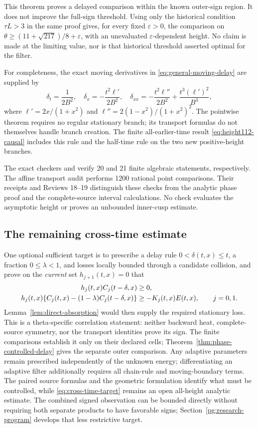 \documentclass[11pt]{article}
\numberwithin{equation}{section}
\theoremstyle{definition}
\theoremstyle{remark}
\begin{document}
This theorem proves a delayed comparison within the known outer-sign
region.  It does not improve the full-sign threshold.  Using only the
historical condition $\tau L>3$ in the same proof gives, for every
fixed $\varepsilon>0$, the comparison on
$\theta\ge(11+\sqrt{217})/8+\varepsilon$, with an unevaluated
$\varepsilon$-dependent height.  No claim is made at the limiting
value, nor is that historical threshold asserted optimal for the filter.

For completeness, the exact moving derivatives in
\eqref{eq:general-moving-delay} are supplied by
\[
 \delta_t=\frac1{2B^2},\quad
 \delta_x=-\frac{t^2\ell'}{2B^2},\quad
 \delta_{xx}=-\frac{t^2\ell''}{2B^2}
                  +\frac{t^3(\ell')^2}{B^3},
\]
where $\ell'=2x/(1+x^2)$ and
$\ell''=2(1-x^2)/(1+x^2)^2$.  The pointwise theorem requires no
regular stationary branch; its transport formulas do not themselves
handle branch creation.  The finite all-earlier-time result
\eqref{eq:height112-causal} includes this rule and the half-time rule
on the two new positive-height branches.

The exact checkers
 and
verify 20 and 21 finite algebraic statements, respectively.  The affine
transport audit performs 1200 rational point comparisons.  Their
receipts and Reviews 18--19 distinguish these checks from the analytic
phase proof and the complete-source interval calculations.  No check
evaluates the asymptotic height or proves an unbounded inner-cusp estimate.

\subsection{The remaining cross-time estimate}

One optional sufficient target is to prescribe a delay rule $0<\delta(t,x)\le t$,
a fraction $0\le\lambda<1$, and losses locally bounded through a
candidate collision, and prove on the \emph{current} set $h_{j+1}(t,x)=0$
that
\begin{align}
 h_j(t,x)C_j(t-\delta,x)&\ge0,\notag\\
 h_j(t,x)\{C_j(t,x)-(1-\lambda)C_j(t-\delta,x)\}
        &\ge-K_j(t,x)E(t,x),\qquad j=0,1.
 \label{eq:cross-time-target}
\end{align}
Lemma~\ref{lem:direct-absorption} would then supply the required
stationary loss. This is a theta-specific correlation statement: neither
backward heat, complete-source symmetry, nor the transport identities
prove its sign. The finite comparisons establish it only on their declared
cells; Theorem~\ref{thm:phase-controlled-delay} gives the separate
outer comparison. Any adaptive parameters remain prescribed independently of the
unknown energy; differentiating an adaptive filter additionally requires
all chain-rule and moving-boundary terms. The paired source formulas and
the geometric formulation identify what must be controlled, while
\eqref{eq:cross-time-target} remains an open all-height analytic estimate.
The combined signed observation can be bounded directly without
requiring both separate products to have favorable signs;
Section~\ref{pg:research-program} develops that less restrictive target.
\end{document}
